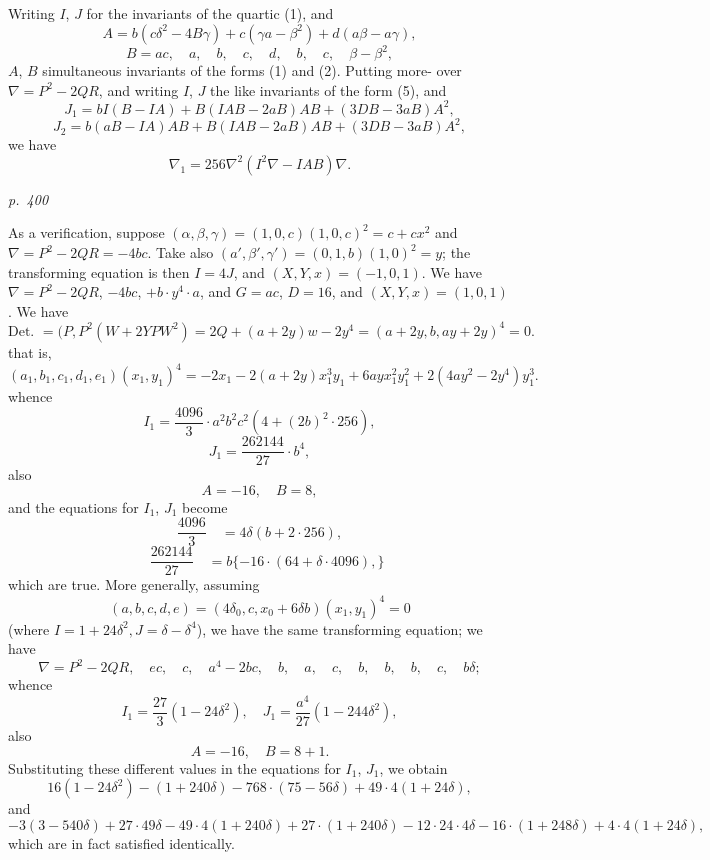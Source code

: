 \documentclass[11pt,a4paper]{article}
\theoremstyle{plain}
\theoremstyle{definition}
\begin{document}
Writing $I$, $J$ for the invariants of the quartic (1), and
\[
A = b(c\delta^2 - 4B\gamma) + c(\gamma a - \beta^2) + d(a\beta - a\gamma),
\]
\[
B = a c, \quad a, \quad b, \quad c, \quad d, \quad b, \quad c, \quad \beta - \beta^2,
\]
$A$, $B$ simultaneous invariants of the forms (1) and (2). Putting more-
over $\nabla = P^2 - 2QR$, and writing $I$, $J$ the like invariants of the form (5), and
\[
J_1 = b I (B - I A) + B(I A B - 2 a B)A B + (3 D B - 3 a B)A^2,
\]
\[
J_2 = b (a B - I A)A B + B(I A B - 2 a B)A B + (3 D B - 3 a B)A^2,
\]
we have
\[
\nabla_1 = 256 \nabla^2 (I^2 \nabla - I A B) \nabla.
\]

\clearpage

\bigskip
\textit{p.~400}
\smallskip

\noindent
As a verification, suppose $(\alpha, \beta, \gamma) = (1, 0, c)(1, 0, c)^2 = c + cx^2$ and $\nabla = P^2 - 2QR = -4 bc$.
Take also $(a', \beta', \gamma') = (0, 1, b)(1, 0)^2 = y$; the transforming equation is then $I = 4 J$, and
$(X, Y, x) = (-1, 0, 1)$. We have $\nabla = P^2 - 2 Q R$, $-4 b c$, $+ b \cdot y^4 \cdot a$, and $G = a c$, $D = 16$, and
$(X, Y, x) = (1, 0, 1)$. We have
\[
\text{Det. } = (P, P^2(W + 2Y P W^2) = 2Q + (a + 2y)w - 2y^4 = (a + 2y, b, ay + 2y)^4 = 0.
\]
that is,
\[
(a_1, b_1, c_1, d_1, e_1)(x_1, y_1)^4 = -2x_1 - 2(a + 2y)x_1^3y_1 + 6 a y x_1^2 y_1^2 + 2 (4 a y^2 - 2y^4)y_1^3.
\]
whence
\[
I_1 = \frac{4096}{3} \cdot a^2 b^2 c^2 (4 + (2 b)^2 \cdot 256),
\]
\[
J_1 = \frac{262144}{27} \cdot b^4,
\]
also
\[
A = -16, \quad B = 8,
\]
and the equations for $I_1$, $J_1$ become
\[
\frac{4096}{3} \quad = 4 \delta (b + 2 \cdot 256),
\]
\[
\quad \frac{262144}{27} \quad = b\{-16 \cdot (64 + \delta \cdot 4096),\}
\]
which are true. More generally, assuming
\[
(a, b, c, d, e) = (4 \delta_0, c, x_0 + 6 \delta b)(x_1, y_1)^4 = 0
\]
(where $I = 1 + 24 \delta^2, J = \delta - \delta^4$), we have the same transforming equation; we have
\[
\nabla = P^2 - 2 Q R, \quad e c, \quad c, \quad a^4 - 2 b c, \quad b, \quad a, \quad c, \quad b, \quad b, \quad b, \quad c, \quad b\delta;
\]
whence
\[
I_1 = \frac{27}{3}(1 - 24 \delta^2), \quad J_1 = \frac{a^4}{27}(1 - 244 \delta^2),
\]
also
\[
A = -16, \quad B = 8 + 1.
\]
Substituting these different values in the equations for $I_1$, $J_1$, we obtain
\[
16 (1 - 24 \delta^2) - (1 + 240 \delta) - 768 \cdot (75 - 56 \delta) + 49 \cdot 4 (1 + 24 \delta),
\]
and
\[
-3 (3 - 540 \delta) + 27 \cdot 49 \delta - 49 \cdot 4 (1 + 240 \delta) + 27 \cdot (1 + 240 \delta) - 12 \cdot 24 \cdot 4 \delta - 16 \cdot (1 + 248 \delta) + 4 \cdot 4 (1 + 24 \delta),
\]
which are in fact satisfied identically.
\end{document}
